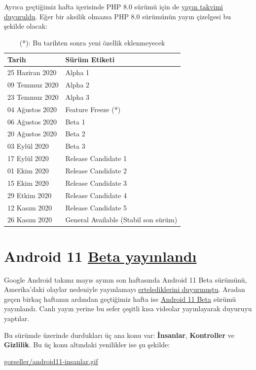 \documentclass[11pt]{article}
\begin{document}
Ayrıca geçtiğimiz hafta içerisinde PHP 8.0 sürümü için de \href{https://wiki.php.net/todo/php80}{yayın takvimi}
\href{https://externals.io/message/110470}{duyuruldu}. Eğer bir aksilik olmazsa PHP 8.0 sürümünün yayın çizelgesi bu
şekilde olacak:
\begin{table}[htbp]
\caption{(*): Bu tarihten sonra yeni özellik eklenmeyecek}
\centering
\begin{tabular}{ll}
\hline
Tarih & Sürüm Etiketi\\
\hline
25 Haziran 2020 & Alpha 1\\
09 Temmuz 2020 & Alpha 2\\
23 Temmuz 2020 & Alpha 3\\
04 Ağustos 2020 & Feature Freeze (*)\\
06 Ağustos 2020 & Beta 1\\
20 Ağustos 2020 & Beta 2\\
03 Eylül 2020 & Beta 3\\
17 Eylül 2020 & Release Candidate 1\\
01 Ekim 2020 & Release Candidate 2\\
15 Ekim 2020 & Release Candidate 3\\
29 Etkim 2020 & Release Candidate 4\\
12 Kasım 2020 & Release Candidate 5\\
26 Kasım 2020 & General Available (Stabil son sürüm)\\
\end{tabular}
\end{table}
\section{Android 11 \href{https://blog.google/products/android/android-11-beta/}{Beta yayınlandı}}
\label{sec:org3d3c408}
Google Android takımı mayıs ayının son haftasında Android 11 Beta sürümünü,
Amerika'daki olaylar nedeniyle yayınlamayı \href{https://twitter.com/AndroidDev/status/1266589514937466880}{ertelediklerini duyurmuştu}. Aradan
geçen birkaç haftanın ardından geçtiğimiz hafta ise \href{https://developer.android.com/android11}{Android 11 Beta} sürümü
yayınlandı. Canlı yayın yerine bu sefer çeşitli kısa videolar yayınlayarak
duyuruyu yaptılar.

Bu sürümde üzerinde durdukları üç ana konu var: \textbf{İnsanlar}, \textbf{Kontroller} ve
\textbf{Gizlilik}. Bu üç konu altındaki yenilikler ise şu şekilde:

\url{gorseller/android11-insanlar.gif}
\end{document}
